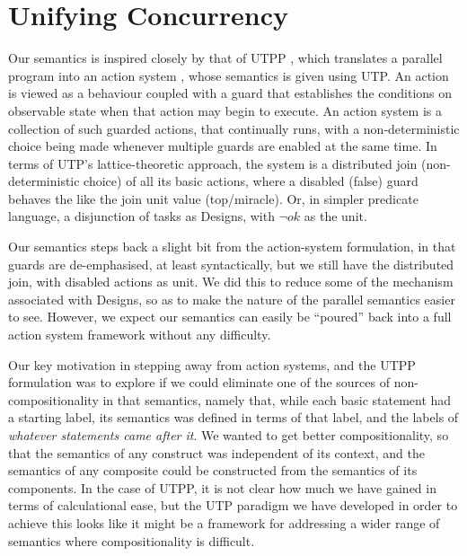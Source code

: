 \section{Unifying Concurrency}\label{ha:UTCP}


Our semantics is inspired closely by that of
UTPP \cite{DBLP:conf/icfem/WoodcockH02},
which translates a parallel program into an action system \cite{PODC::BackK1983},
whose semantics is given using UTP.
An action is viewed as a behaviour coupled with a guard that
establishes the conditions on observable state when that action may
begin to execute. An action system is a collection of such guarded actions,
that continually runs, with a non-deterministic choice being made whenever
multiple guards are enabled at the same time\cite{1976:book:dijkstra}.
In terms of UTP's lattice-theoretic approach,
the system is a distributed join (non-deterministic choice) of all its basic actions,
where a disabled (false) guard behaves the like the join unit value (top/miracle).
Or, in simpler predicate language, a disjunction of tasks as Designs,
with $\lnot ok$ as the unit.


Our semantics steps back a slight bit from the action-system formulation,
in that guards are de-emphasised, at least syntactically,
but we still have the distributed join, with disabled actions as unit.
We did this to reduce some of the mechanism associated with Designs,
so as to make the nature of the parallel semantics easier to see.
However, we expect our semantics can easily be ``poured'' back into a
full action system framework without any difficulty.

Our key motivation in stepping away from action systems,
and the UTPP formulation was to explore if we could eliminate one of the
sources of non-compositionality in that semantics,
namely that, while each basic statement had a starting label,
its semantics was defined in terms of that label,
and the labels of \emph{whatever statements came after it}.
We wanted to get better compositionality, so that the semantics of any construct was independent of its context,
and the semantics of any composite could be constructed from
the semantics of its components.
In the case of UTPP, it is not clear how much we have gained in terms
of calculational ease, but the UTP paradigm we have developed in order to
achieve this looks like it might be a framework for addressing a wider range of semantics where compositionality is difficult.



